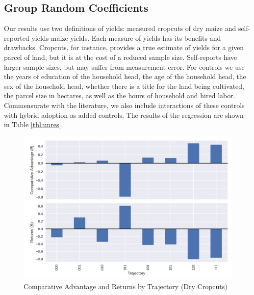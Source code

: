 \documentclass{article}
\begin{document}
\subsection{Group Random Coefficients}

Our results use two definitions of yields: measured cropcuts of dry maize and self-reported yields maize yields. Each measure of yields has its benefits and drawbacks. Cropcuts, for instance, provides a true estimate of yields for a given parcel of land, but it is at the cost of a reduced sample size. Self-reports have larger sample sizes, but may suffer from measurement error. For controls we use the years of education of the household head, the age of the household head, the sex of the household head, whether there is a title for the land being cultivated, the parcel size in hectares, as well as the hours of household and hired labor. Commensurate with the literature, we also include interactions of these controls with hybrid adoption as added controls. The results of the regression are shown in Table \ref{tbl:unres}.

\resizebox{1\textwidth}{!}{

}

\resizebox{1\textwidth}{!}{
\centering
% 


}
% 

\begin{figure}
    \centering
    \includegraphics[scale=0.75]{results/figures/theta.png}
    \caption{Comparative Advantage and Returns by Trajectory (Dry Cropcuts)}
    \label{fig:theta_delta_raw}
\end{figure}
\end{document}
